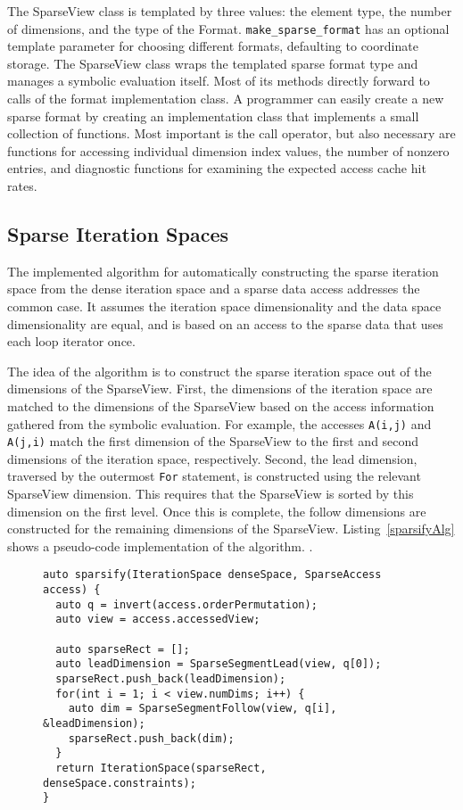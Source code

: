 The SparseView class is templated by three values: the element type, the number of dimensions, and the type of the Format.
\verb.make_sparse_format. has an optional template parameter for choosing different formats, defaulting to coordinate storage.
The SparseView class wraps the templated sparse format type and manages a symbolic evaluation itself.
Most of its methods directly forward to calls of the format implementation class.
A programmer can easily create a new sparse format by creating an implementation class that implements a small collection of functions.
Most important is the call operator, but also necessary are functions for accessing individual dimension index values, the number of nonzero entries, and diagnostic functions for examining the expected access cache hit rates.

\subsection{Sparse Iteration Spaces}
The implemented algorithm for automatically constructing the sparse iteration space from the dense iteration space and a sparse data access addresses the common case.
It assumes the iteration space dimensionality and the data space dimensionality are equal, and is based on an access to the sparse data that uses each loop iterator once.

The idea of the algorithm is to construct the sparse iteration space out of the dimensions of the SparseView. 
First, the dimensions of the iteration space are matched to the dimensions of the SparseView based on the access information gathered from the symbolic evaluation.
For example, the accesses \verb.A(i,j). and \verb.A(j,i). match the first dimension of the SparseView to the first and second dimensions of the iteration space, respectively.
Second, the lead dimension, traversed by the outermost \verb.For. statement, is constructed using the relevant SparseView dimension.
This requires that the SparseView is sorted by this dimension on the first level.
Once this is complete, the follow dimensions are constructed for the remaining dimensions of the SparseView.
Listing~\ref{sparsifyAlg} shows a pseudo-code implementation of the algorithm.
.

\begin{figure}
\begin{lstlisting}[caption={Abbreviated algorithm for sparsifying a dense iteration space.}, label=sparsifyAlg]
auto sparsify(IterationSpace denseSpace, SparseAccess access) {
  auto q = invert(access.orderPermutation);
  auto view = access.accessedView;

  auto sparseRect = [];
  auto leadDimension = SparseSegmentLead(view, q[0]);
  sparseRect.push_back(leadDimension);
  for(int i = 1; i < view.numDims; i++) {
    auto dim = SparseSegmentFollow(view, q[i], &leadDimension);
    sparseRect.push_back(dim);
  }
  return IterationSpace(sparseRect, denseSpace.constraints);
}
\end{lstlisting}
\end{figure}

